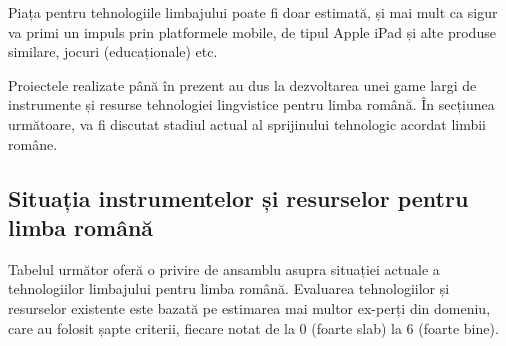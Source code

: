\documentclass[]{../../metanetpaper}
\begin{document}
\begin{multicols}{2}
Piața pentru tehnologiile limbajului poate fi doar estimată, și mai mult ca sigur va primi un impuls prin platformele mobile, de tipul Apple iPad și alte produse similare, jocuri (educaționale) etc.

Proiectele realizate până în prezent au dus la dezvoltarea unei game largi de instrumente și resurse tehnologiei lingvistice pentru limba română. În secțiunea următoare, va fi discutat stadiul actual al sprijinului tehnologic acordat limbii române.

\subsection{Situația instrumentelor și resurselor pentru limba română}

Tabelul următor oferă o privire de ansamblu asupra situației actuale a tehnologiilor limbajului pentru limba română. Evaluarea tehnologiilor și resurselor existente este bazată pe estimarea mai multor ex-\newline perți din domeniu, care au folosit șapte criterii, fiecare notat de la 0 (foarte slab) la 6 (foarte bine).


\end{multicols}
\end{document}
